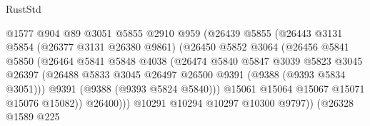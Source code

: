 \begin{lexlean}{RustStd}
\begin{coremodule}
                                  @1577
                                  @904
                                  @89
                                  @3051
                                  @5855
                                  @2910
                                  @959
                                  (@26439
                                    @5855
                                    (@26443
                                      @3131
                                      @5854
                                      (@26377 @3131 @26380 @9861)
                                      (@26450
                                        @5852
                                        @3064
                                        (@26456
                                          @5841
                                          @5850
                                          (@26464
                                            @5841
                                            @5848
                                            @4038
                                            (@26474
                                              @5840
                                              @5847
                                              @3039
                                              @5823
                                              @3045
                                              @26397
                                              (@26488
                                                @5833
                                                @3045
                                                @26497
                                                @26500
                                                @9391
                                                (@9388 (@9393 @5834 @3051)))
                                              @9391
                                              (@9388 (@9393 @5824 @5840)))
                                            @15061
                                            @15064
                                            @15067
                                            @15071
                                            @15076
                                            @15082))
                                        @26400)))
                                  @10291
                                  @10294
                                  @10297
                                  @10300
                                  @9797))
                              (@26328
                                @1589
                                @225

\end{coremodule}
\end{lexlean}
